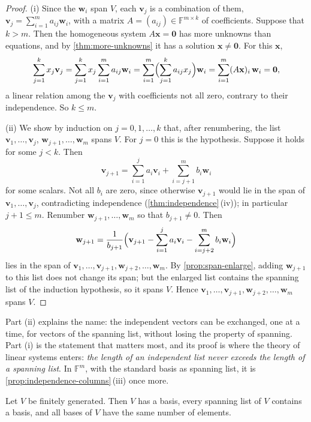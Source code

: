 \begin{proof}
(i) Since the $\mathbf w_i$ span $V$, each $\mathbf v_j$ is a combination of them, $\mathbf v_j=\sum_{i=1}^ma_{ij}\mathbf w_i$, with a matrix $A=(a_{ij})\in\mathbb F^{m\times k}$ of coefficients. Suppose that $k>m$. Then the homogeneous system $A\mathbf x=\mathbf 0$ has more unknowns than equations, and by \cref{thm:more-unknowns} it has a solution $\mathbf x\ne\mathbf 0$. For this $\mathbf x$,
\[
\sum_{j=1}^kx_j\mathbf v_j=\sum_{j=1}^kx_j\sum_{i=1}^ma_{ij}\mathbf w_i=\sum_{i=1}^m\Bigl(\sum_{j=1}^ka_{ij}x_j\Bigr)\mathbf w_i=\sum_{i=1}^m(A\mathbf x)_i\,\mathbf w_i=\mathbf 0,
\]
a linear relation among the $\mathbf v_j$ with coefficients not all zero, contrary to their independence. So $k\le m$.

(ii) We show by induction on $j=0,1,\ldots,k$ that, after renumbering, the list $\mathbf v_1,\ldots,\mathbf v_j$, $\mathbf w_{j+1},\ldots,\mathbf w_m$ spans $V$. For $j=0$ this is the hypothesis. Suppose it holds for some $j<k$. Then
\[
\mathbf v_{j+1}=\sum_{i=1}^ja_i\mathbf v_i+\sum_{i=j+1}^mb_i\mathbf w_i
\]
for some scalars. Not all $b_i$ are zero, since otherwise $\mathbf v_{j+1}$ would lie in the span of $\mathbf v_1,\ldots,\mathbf v_j$, contradicting independence (\cref{thm:independence}\,(iv)); in particular $j+1\le m$. Renumber $\mathbf w_{j+1},\ldots,\mathbf w_m$ so that $b_{j+1}\ne0$. Then
\[
\mathbf w_{j+1}=\frac1{b_{j+1}}\Bigl(\mathbf v_{j+1}-\sum_{i=1}^ja_i\mathbf v_i-\sum_{i=j+2}^mb_i\mathbf w_i\Bigr)
\]
lies in the span of $\mathbf v_1,\ldots,\mathbf v_{j+1},\mathbf w_{j+2},\ldots,\mathbf w_m$. By \cref{prop:span-enlarge}, adding $\mathbf w_{j+1}$ to this list does not change its span; but the enlarged list contains the spanning list of the induction hypothesis, so it spans $V$. Hence $\mathbf v_1,\ldots,\mathbf v_{j+1},\mathbf w_{j+2},\ldots,\mathbf w_m$ spans $V$.
\end{proof}

Part (ii) explains the name: the independent vectors can be exchanged, one at a time, for vectors of the spanning list, without losing the property of spanning. Part (i) is the statement that matters most, and its proof is where the theory of linear systems enters: \emph{the length of an independent list never exceeds the length of a spanning list}. In $\mathbb F^m$, with the standard basis as spanning list, it is \cref{prop:independence-columns}\,(iii) once more.

\begin{theorem}[Dimension]
\label{thm:dimension}
Let $V$ be finitely generated. Then $V$ has a basis, every spanning list of $V$ contains a basis, and all bases of $V$ have the same number of elements.
\end{theorem}

